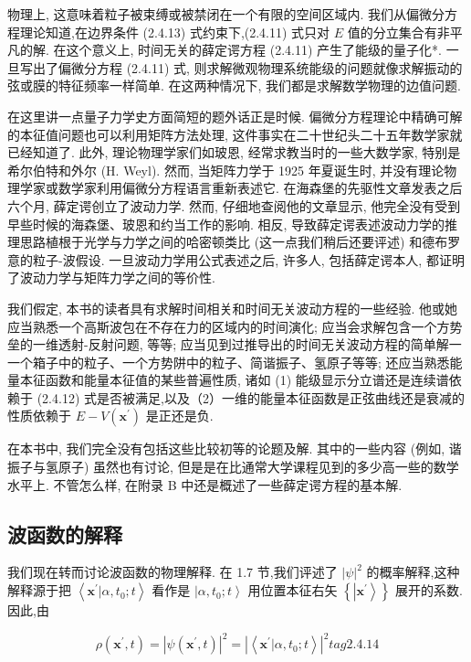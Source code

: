\documentclass[lang=cn,newtx,10pt,scheme=chinese,thmcnt=section]{elegantbook}
\begin{document}
物理上, 这意味着粒子被束缚或被禁闭在一个有限的空间区域内. 我们从偏微分方程理论知道,在边界条件 (2.4.13) 式约束下,(2.4.11) 式只对 $E$ 值的分立集合有非平凡的解. 在这个意义上, 时间无关的薛定谔方程 (2.4.11) 产生了能级的量子化*. 一旦写出了偏微分方程 (2.4.11) 式, 则求解微观物理系统能级的问题就像求解振动的弦或膜的特征频率一样简单. 在这两种情况下, 我们都是求解数学物理的边值问题.

在这里讲一点量子力学史方面简短的题外话正是时候. 偏微分方程理论中精确可解的本征值问题也可以利用矩阵方法处理, 这件事实在二十世纪头二十五年数学家就已经知道了. 此外, 理论物理学家们如玻恩, 经常求教当时的一些大数学家, 特别是希尔伯特和外尔 (H. Weyl). 然而, 当矩阵力学于 1925 年夏诞生时, 并没有理论物理学家或数学家利用偏微分方程语言重新表述它. 在海森堡的先驱性文章发表之后六个月, 薛定谔创立了波动力学. 然而, 仔细地查阅他的文章显示, 他完全没有受到早些时候的海森堡、玻恩和约当工作的影响. 相反, 导致薛定谔表述波动力学的推理思路植根于光学与力学之间的哈密顿类比 (这一点我们稍后还要评述) 和德布罗意的粒子-波假设. 一旦波动力学用公式表述之后, 许多人, 包括薛定谔本人, 都证明了波动力学与矩阵力学之间的等价性.

我们假定, 本书的读者具有求解时间相关和时间无关波动方程的一些经验. 他或她应当熟悉一个高斯波包在不存在力的区域内的时间演化; 应当会求解包含一个方势垒的一维透射-反射问题, 等等; 应当见到过推导出的时间无关波动方程的简单解一一个箱子中的粒子、一个方势阱中的粒子、简谐振子、氢原子等等; 还应当熟悉能量本征函数和能量本征值的某些普遍性质, 诸如 (1) 能级显示分立谱还是连续谱依赖于 (2.4.12) 式是否被满足,以及（2）一维的能量本征函数是正弦曲线还是衰减的性质依赖于 $E - V\left( {\mathbf{x}}^{\prime }\right)$ 是正还是负.

在本书中, 我们完全没有包括这些比较初等的论题及解. 其中的一些内容 (例如, 谐振子与氢原子) 虽然也有讨论, 但是是在比通常大学课程见到的多少高一些的数学水平上. 不管怎么样, 在附录 B 中还是概述了一些薛定谔方程的基本解.

\subsection*{波函数的解释}
我们现在转而讨论波函数的物理解释. 在 1.7 节,我们评述了 ${\left| \psi \right| }^{2}$ 的概率解释,这种解释源于把 $\left\langle {{\mathbf{x}}^{\prime } | \alpha ,{t}_{0};t}\right\rangle$ 看作是 $\left. {| \alpha ,{t}_{0};t}\right\rangle$ 用位置本征右矢 $\left\{ \left| {\mathbf{x}}^{\prime }\right\rangle \right\}$ 展开的系数. 因此,由

$$
\rho \left( {{\mathbf{x}}^{\prime }, t}\right) = {\left| \psi \left( {\mathbf{x}}^{\prime }, t\right) \right| }^{2} = {\left| \left\langle {\mathbf{x}}^{\prime } | \alpha ,{t}_{0};t\right\rangle \right| }^{2} tag{2.4.14}
$$
\end{document}
